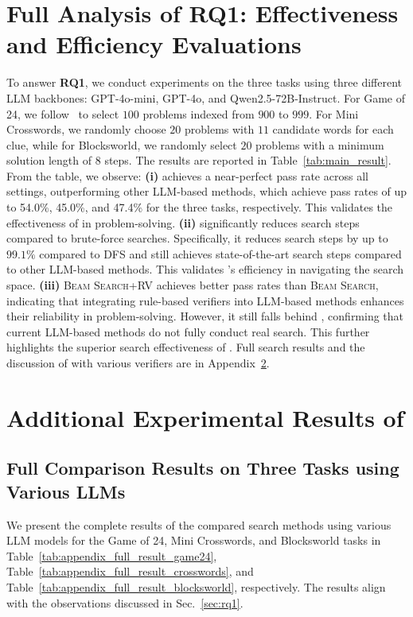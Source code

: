 \section{Full Analysis of RQ1: Effectiveness and Efficiency Evaluations}
\label{appendix:rq1_appendix}
To answer \textbf{RQ1}, we conduct experiments on the three tasks using three different LLM backbones: GPT-4o-mini, GPT-4o, and Qwen2.5-72B-Instruct. For Game of 24, we follow~\cite{yao2023tree} to select $100$ problems indexed from $900$ to $999$. For Mini Crosswords, we randomly choose $20$ problems with $11$ candidate words for each clue, while for Blocksworld, we randomly select $20$ problems with a minimum solution length of $8$ steps. The results are reported in Table~\ref{tab:main_result}.
From the table, we observe:
\textbf{(i)} \method achieves a near-perfect pass rate across all settings, outperforming other LLM-based methods, which achieve pass rates of up to 54.0\%, 45.0\%, and 47.4\% for the three tasks, respectively. This validates the effectiveness of \method in problem-solving.
\textbf{(ii)} \method significantly reduces search steps compared to brute-force searches. Specifically, it reduces search steps by up to $99.1\%$ compared to \textsc{DFS} and still achieves state-of-the-art search steps compared to other LLM-based methods. This validates \method's efficiency in navigating the search space.
\textbf{(iii)} \textsc{Beam Search+RV} achieves better pass rates than \textsc{Beam Search}, indicating that integrating rule-based verifiers into LLM-based methods enhances their reliability in problem-solving. However, it still falls behind \method, confirming that current LLM-based methods do not fully conduct real search. This further highlights the superior search effectiveness of \method.
Full search results and the discussion of \method with various verifiers are in Appendix~\ref{appendix:additional_results_seal}.

\section{Additional Experimental Results of \method}
\label{appendix:additional_results_seal}

\subsection{Full Comparison Results on Three Tasks using Various LLMs}
\label{appendix:full_comparison_results_on_three_tasks_three_LLMs}


We present the complete results of the compared search methods using various LLM models for the Game of 24, Mini Crosswords, and Blocksworld tasks in Table~\ref{tab:appendix_full_result_game24}, Table~\ref{tab:appendix_full_result_crosswords}, and Table~\ref{tab:appendix_full_result_blocksworld}, respectively. The results align with the observations discussed in Sec.~\ref{sec:rq1}.

